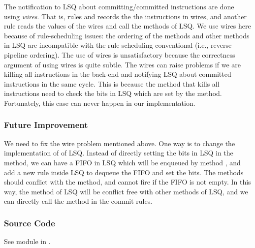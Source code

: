 The notification to LSQ about committing/committed instructions are done using \emph{wires}.
That is, rules  and  records the the instructions in wires, and another rule reads the values of the wires and call the  methods of LSQ.
We use wires here because of rule-scheduling issues: the ordering of the  methods and other methods in LSQ are incompatible with the rule-scheduling conventional (i.e., reverse pipeline ordering).
The use of wires is unsatisfactory because the correctness argument of using wires is quite subtle.
The wires can raise problems if we are killing all instructions in the back-end and notifying LSQ about committed instructions in the same cycle.
This is because the  method that kills all instructions need to check the  bits in LSQ which are set by the  method.
Fortunately, this case can never happen in our implementation.

\subsubsection{Future Improvement}
We need to fix the wire problem mentioned above.
One way is to change the implementation of  of LSQ.
Instead of directly setting the  bits in LSQ in the method, we can have a FIFO in LSQ which will be enqueued by method , and add a new rule inside LSQ to dequeue the FIFO and set the  bits.
The  methods should conflict with the  method, and cannot fire if the FIFO is not empty.
In this way, the  method of LSQ will be conflict free with other methods of LSQ, and we can directly call the method in the commit rules.

\subsubsection{Source Code}
See module  in .
